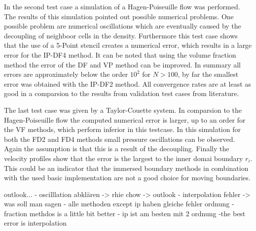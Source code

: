 In the second test case a simulation of a Hagen-Poiseuille flow was performed.
The results of this simulation pointed out possible numerical problems.
One possible problem are numerical oscillations which are eventually caused
by the decoupling of neighboor cells in the density.
Furthermore this test case shows that the use of a 5-Point stencil creates a numerical error,
which results in a large error for the IP-DF4 method.
It can be noted that using the volume fraction method  the error of the DF and VP method can be improved.
In summary all errors are approximately below the order  $10^2$ for $N>100$,
by far the smallest error was obtained with the IP-DF2 method.
All convergence rates are at least as good in a comparsion
to the results from validation test cases from literature.

The last test case was given by a Taylor-Couette system.
In comparsion to the Hagen-Poiseuille flow the  computed numerical error is larger,
up to an order for the VF methods, which perform inferior in this testcase.
In this simulation for both the FD2 and FD4 methods small pressure oscillations can be observed.
Again the assumption is that this is a result of the decoupling.
Finally the velocity profiles show that the error is the largest to the inner domai boundary $r_i$.
This could be an indicator that the immersed boundary methods in combination with the used basic implementation
are not a good choice for moving boundaries.

outlook...
- oscilllation abklären -> rhie chow -> outlook
- interpolation fehler -> was soll man sagen
- alle methoden except ip haben gleiche fehler ordnung
- fraction methdos is a little bit better
- ip ist am besten mit 2 ordnung
-the best error is interpolation



